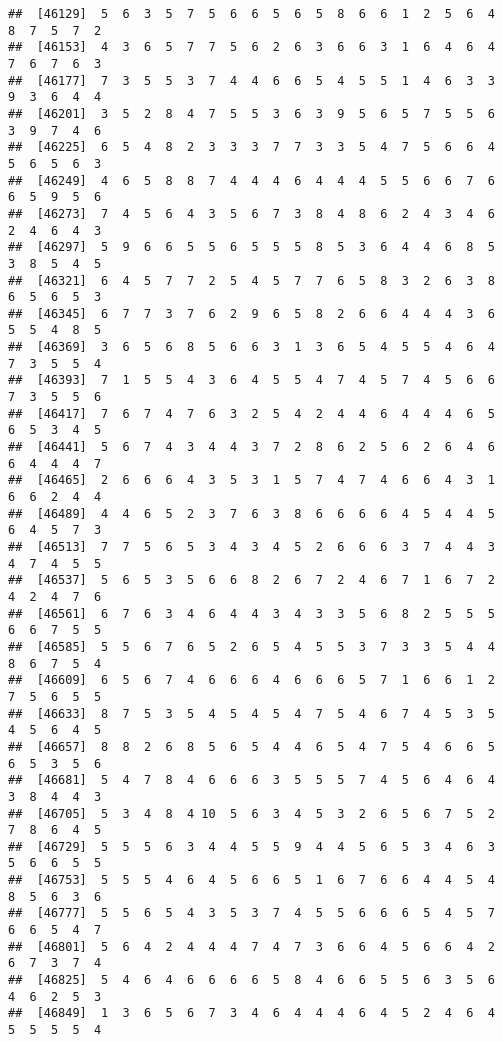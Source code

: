 \documentclass[
]{book}
\begin{document}
\begin{verbatim}
##  [46129]  5  6  3  5  7  5  6  6  5  6  5  8  6  6  1  2  5  6  4  8  7  5  7  2
##  [46153]  4  3  6  5  7  7  5  6  2  6  3  6  6  3  1  6  4  6  4  7  6  7  6  3
##  [46177]  7  3  5  5  3  7  4  4  6  6  5  4  5  5  1  4  6  3  3  9  3  6  4  4
##  [46201]  3  5  2  8  4  7  5  5  3  6  3  9  5  6  5  7  5  5  6  3  9  7  4  6
##  [46225]  6  5  4  8  2  3  3  3  7  7  3  3  5  4  7  5  6  6  4  5  6  5  6  3
##  [46249]  4  6  5  8  8  7  4  4  4  6  4  4  4  5  5  6  6  7  6  6  5  9  5  6
##  [46273]  7  4  5  6  4  3  5  6  7  3  8  4  8  6  2  4  3  4  6  2  4  6  4  3
##  [46297]  5  9  6  6  5  5  6  5  5  5  8  5  3  6  4  4  6  8  5  3  8  5  4  5
##  [46321]  6  4  5  7  7  2  5  4  5  7  7  6  5  8  3  2  6  3  8  6  5  6  5  3
##  [46345]  6  7  7  3  7  6  2  9  6  5  8  2  6  6  4  4  4  3  6  5  5  4  8  5
##  [46369]  3  6  5  6  8  5  6  6  3  1  3  6  5  4  5  5  4  6  4  7  3  5  5  4
##  [46393]  7  1  5  5  4  3  6  4  5  5  4  7  4  5  7  4  5  6  6  7  3  5  5  6
##  [46417]  7  6  7  4  7  6  3  2  5  4  2  4  4  6  4  4  4  6  5  6  5  3  4  5
##  [46441]  5  6  7  4  3  4  4  3  7  2  8  6  2  5  6  2  6  4  6  6  4  4  4  7
##  [46465]  2  6  6  6  4  3  5  3  1  5  7  4  7  4  6  6  4  3  1  6  6  2  4  4
##  [46489]  4  4  6  5  2  3  7  6  3  8  6  6  6  6  4  5  4  4  5  6  4  5  7  3
##  [46513]  7  7  5  6  5  3  4  3  4  5  2  6  6  6  3  7  4  4  3  4  7  4  5  5
##  [46537]  5  6  5  3  5  6  6  8  2  6  7  2  4  6  7  1  6  7  2  4  2  4  7  6
##  [46561]  6  7  6  3  4  6  4  4  3  4  3  3  5  6  8  2  5  5  5  6  6  7  5  5
##  [46585]  5  5  6  7  6  5  2  6  5  4  5  5  3  7  3  3  5  4  4  8  6  7  5  4
##  [46609]  6  5  6  7  4  6  6  6  4  6  6  6  5  7  1  6  6  1  2  7  5  6  5  5
##  [46633]  8  7  5  3  5  4  5  4  5  4  7  5  4  6  7  4  5  3  5  4  5  6  4  5
##  [46657]  8  8  2  6  8  5  6  5  4  4  6  5  4  7  5  4  6  6  5  6  5  3  5  6
##  [46681]  5  4  7  8  4  6  6  6  3  5  5  5  7  4  5  6  4  6  4  3  8  4  4  3
##  [46705]  5  3  4  8  4 10  5  6  3  4  5  3  2  6  5  6  7  5  2  7  8  6  4  5
##  [46729]  5  5  5  6  3  4  4  5  5  9  4  4  5  6  5  3  4  6  3  5  6  6  5  5
##  [46753]  5  5  5  4  6  4  5  6  6  5  1  6  7  6  6  4  4  5  4  8  5  6  3  6
##  [46777]  5  5  6  5  4  3  5  3  7  4  5  5  6  6  6  5  4  5  7  6  6  5  4  7
##  [46801]  5  6  4  2  4  4  4  7  4  7  3  6  6  4  5  6  6  4  2  6  7  3  7  4
##  [46825]  5  4  6  4  6  6  6  6  5  8  4  6  6  5  5  6  3  5  6  4  6  2  5  3
##  [46849]  1  3  6  5  6  7  3  4  6  4  4  4  6  4  5  2  4  6  4  5  5  5  5  4

\end{verbatim}
\end{document}
